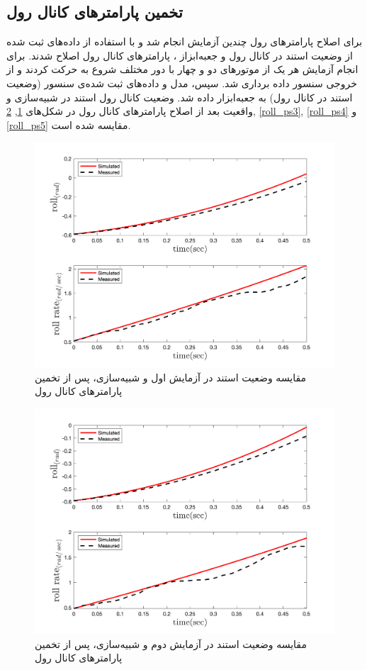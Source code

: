 \subsection{تخمین پارامترهای کانال رول}
برای اصلاح پارامترهای رول چندین آزمایش انجام شد و با استفاده از داده‌های ثبت شده از وضعیت استند در کانال رول و جعبه‌ابزاز
،
پارامترهای کانال رول اصلاح شدند.
برای انجام آزمایش هر یک از موتورهای دو و چهار  با دور مختلف شروع به حرکت کردند و از خروجی سنسور داده برداری شد. سپس، مدل و داده‌های ثبت شده‌ی سنسور (وضعیت استند در کانال رول) به جعبه‌ابزار
داده شد. وضعیت کانال رول استند در شبیه‌سازی و واقعیت بعد از اصلاح پارامترهای کانال رول در شکل‌های
\ref{roll_ps1}, \ref{roll_ps2}, \ref{roll_ps3}, \ref{roll_ps4} و \ref{roll_ps5}
مقایسه شده است.

\begin{figure}[H]
	\includegraphics[width=12cm]{../../Figures/RCP/roll_parameter_estimation/RCP_roll_S1.png}
	\centering
	\caption{مقايسه وضعیت استند در  آزمايش اول و شبیه‌سازی، پس از تخمین پارامترهای کانال رول}
	\label{roll_ps1}
\end{figure}
\begin{figure}[H]
	\includegraphics[width=12cm]{../../Figures/RCP/roll_parameter_estimation/RCP_roll_S2.png}
	\centering
	\caption{مقايسه وضعیت استند در  آزمايش دوم و شبیه‌سازی، پس از تخمین پارامترهای کانال رول}
	\label{roll_ps2}
\end{figure}
